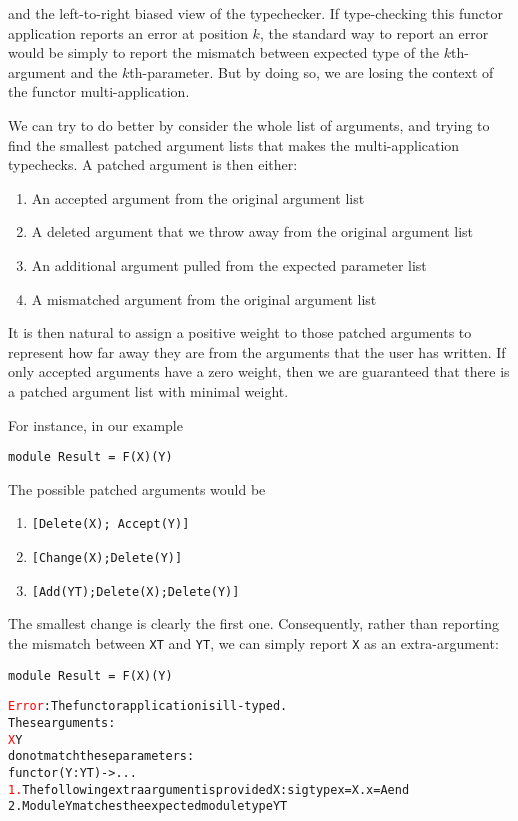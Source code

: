\documentclass[a4paper,11pt]{scrartcl}
\newcommand{\error}[1]{\textcolor{red}{#1}}
\newcommand{\ok}[1]{\textcolor{OliveGreen}{#1}}
\begin{document}
and the left-to-right biased view of the typechecker.
If type-checking this functor application reports an error at position $k$, the standard
way to report an error would be simply to report the mismatch between expected type of
the $k$th-argument and the $k$th-parameter. But by doing so, we are losing the context of the
functor multi-application.

We can try to do better by consider the whole list of arguments, and trying to find the smallest patched argument lists that makes the multi-application typechecks. A patched argument is then either:

\begin{enumerate}
\item An accepted argument from the original argument list
\item A deleted argument that we throw away from the original argument list
\item An additional argument pulled from the expected parameter list
\item A mismatched argument from the original argument list
\end{enumerate}

It is then natural to assign a positive weight to those patched arguments to represent how far away they
are from the arguments that the user has written.
If only accepted arguments have a zero weight, then we are guaranteed that there is a patched argument list
with minimal weight.

For instance, in our example

\begin{verbatim}
module Result = F(X)(Y)
\end{verbatim}

The possible patched arguments would be

\begin{enumerate}
\item \texttt{[Delete(X); Accept(Y)]}
\item \texttt{[Change(X);Delete(Y)]}
\item \texttt{[Add(YT);Delete(X);Delete(Y)]}
\end{enumerate}

The smallest change is clearly the first one. Consequently, rather than reporting
the mismatch between \texttt{XT} and \texttt{YT}, we can simply report \texttt{X}
as an extra-argument:
\begin{verbatim}
module Result = F(X)(Y)
\end{verbatim}
\begin{alltt}
\error{Error}: The functor application is ill-typed.
       These arguments:
         \error{X} \ok{Y}
       do not match these parameters:
         functor  \ok{(Y : YT)} -> ...
  \error{1.} The following extra argument is provided X : sig type x = X.x = A end
  \ok{2.} Module Y matches the expected module type YT
\end{alltt}
\end{document}

